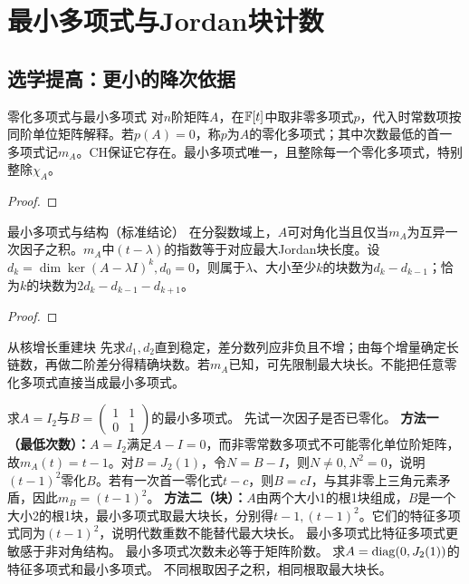 \section{最小多项式与Jordan块计数}
\subsection{选学提高：更小的降次依据}
\begin{definition}{零化多项式与最小多项式}
对$n$阶矩阵$A$，在$\mathbb{F}[t]$中取非零多项式$p$，代入时常数项按同阶单位矩阵解释。若$p(A)=0$，称$p$为$A$的零化多项式；其中次数最低的首一多项式记$m_A$。CH保证它存在。最小多项式唯一，且整除每一个零化多项式，特别整除$\chi_A$。
\end{definition}
\begin{proof}

\end{proof}
\begin{theorem}{最小多项式与结构（标准结论）}
在分裂数域上，$A$可对角化当且仅当$m_A$为互异一次因子之积。$m_A$中$(t-\lambda)$的指数等于对应最大Jordan块长度。设$d_k=\dim\ker(A-\lambda I)^k,d_0=0$，则属于$\lambda$、大小至少$k$的块数为$d_k-d_{k-1}$；恰为$k$的块数为$2d_k-d_{k-1}-d_{k+1}$。
\end{theorem}
\begin{proof}

\end{proof}
\begin{method}{从核增长重建块}
先求$d_1,d_2$直到稳定，差分数列应非负且不增；由每个增量确定长链数，再做二阶差分得精确块数。若$m_A$已知，可先限制最大块长。不能把任意零化多项式直接当成最小多项式。
\end{method}
{求$A=I_2$与$B=\begin{pmatrix}1&1\\0&1\end{pmatrix}$的最小多项式。}
{先试一次因子是否已零化。}
{\textbf{方法一（最低次数）：}$A=I_2$满足$A-I=0$，而非零常数多项式不可能零化单位阶矩阵，故$m_A(t)=t-1$。对$B=J_2(1)$，令$N=B-I$，则$N\ne0,N^2=0$，说明$(t-1)^2$零化$B$。若有一次首一零化式$t-c$，则$B=cI$，与其非零上三角元素矛盾，因此$m_B=(t-1)^2$。
\textbf{方法二（块）：}$A$由两个大小1的根1块组成，$B$是一个大小2的根1块，最小多项式取最大块长，分别得$t-1,(t-1)^2$。它们的特征多项式同为$(t-1)^2$，说明代数重数不能替代最大块长。}
{最小多项式比特征多项式更敏感于非对角结构。}
{最小多项式次数未必等于矩阵阶数。}
{求$A=\operatorname{diag}(0,J_2(1))$的特征多项式和最小多项式。}
{不同根取因子之积，相同根取最大块长。}
